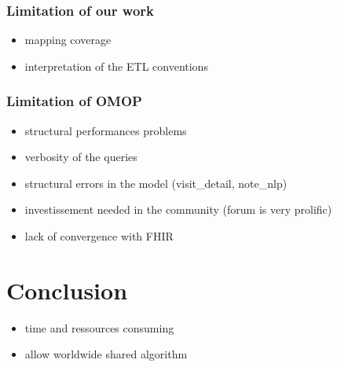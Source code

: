 \subsubsection{Limitation of our work}\label{limitation-of-our-work}

\begin{itemize}
\tightlist
\item
  mapping coverage
\item
  interpretation of the ETL conventions
\end{itemize}

\subsubsection{Limitation of OMOP}\label{limitation-of-omop}

\begin{itemize}
\tightlist
\item
  structural performances problems
\item
  verbosity of the queries
\item
  structural errors in the model (visit\_detail, note\_nlp)
\item
  investissement needed in the community (forum is very prolific)
\item
  lack of convergence with FHIR
\end{itemize}

\section{Conclusion}\label{conclusion-1}

\begin{itemize}
\tightlist
\item
  time and ressources consuming
\item
  allow worldwide shared algorithm
\end{itemize}
